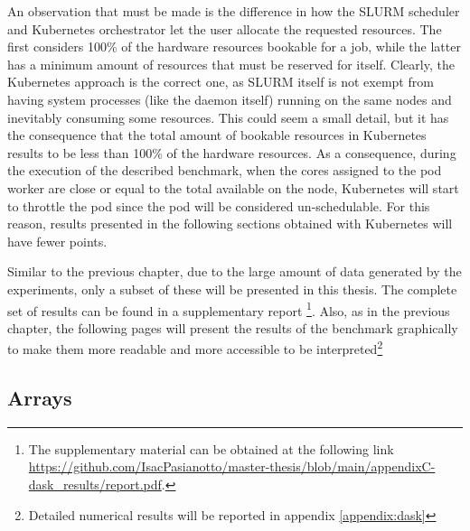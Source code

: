 
An observation that must be made is the difference in how the SLURM scheduler
and Kubernetes orchestrator let the user allocate the requested resources. The
first considers 100\% of the hardware resources bookable for a job, while the
latter has a minimum amount of resources that must be reserved for itself.
Clearly, the Kubernetes approach is the correct one, as SLURM itself is not
exempt from having system processes (like the daemon itself) running on the same
nodes and inevitably consuming some resources. This could seem a small detail,
but it has the consequence that the total amount of bookable resources in
Kubernetes results to be less than 100\% of the hardware resources. As a
consequence, during the execution of the described benchmark, when the cores
assigned to the pod worker are close or equal to the total available on the
node, Kubernetes will start to throttle the pod since the pod will be considered
un-schedulable. For this reason, results presented in the following sections
obtained with Kubernetes will have fewer points.

Similar to the previous chapter, due to the large amount of data generated by
the experiments, only a subset of these will be presented in this thesis. The
complete set of results can be found in a supplementary report \footnote {The
supplementary material can be obtained at the following link
\url{https://github.com/IsacPasianotto/master-thesis/blob/main/appendixC-dask_results/report.pdf}.}.
Also, as in the previous chapter, the following pages will present the results
of the benchmark graphically to make them more readable and more accessible to
be interpreted\footnote{Detailed numerical results will be reported in appendix
\ref{appendix:dask}}


\subsection{Arrays}


